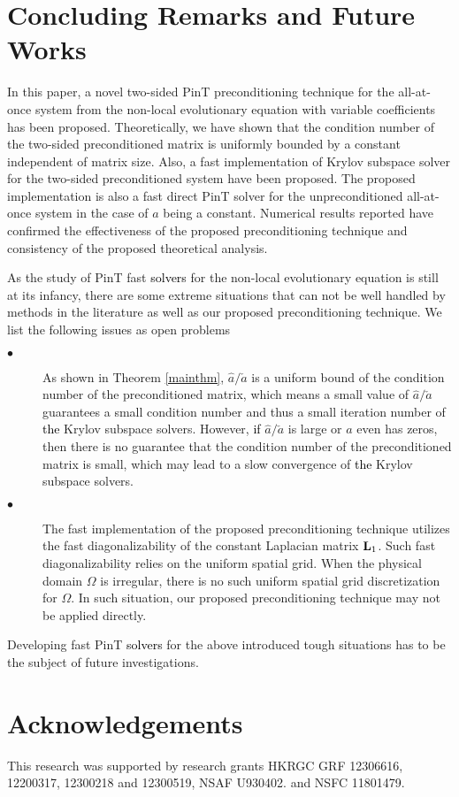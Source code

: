 \documentclass[11pt]{article}%
\numberwithin{equation}{section}
\begin{document}
\section{Concluding Remarks and Future Works}
In this paper, a novel two-sided PinT preconditioning technique for the all-at-once system from the non-local evolutionary equation with variable coefficients has been proposed. Theoretically, we have shown that the condition number of the two-sided preconditioned matrix is uniformly bounded by a constant independent of matrix size. Also, a fast implementation of Krylov subspace solver for the two-sided preconditioned system have been proposed. The proposed implementation is also a fast direct PinT solver for the unpreconditioned all-at-once system in the case of $a$ being a constant.
Numerical results reported have confirmed the effectiveness of the proposed preconditioning technique and consistency of the proposed theoretical analysis.

As the study of PinT fast \textcolor{black}{solvers} for the non-local evolutionary equation is still at its infancy, there are some extreme situations that can not be well handled by methods in the literature  as well as our proposed preconditioning technique. We list  the following issues as open problems 
\begin{description}
\item[$\bullet$] As shown in Theorem \ref{mainthm}, $\hat{a}/\check{a}$ is a uniform bound of the condition number of the preconditioned matrix, which means a small value of $\hat{a}/\check{a}$ guarantees a small condition number and thus a small iteration number of \textcolor{black}{the} Krylov subspace solvers. However, \textcolor{black}{if} $\hat{a}/\check{a}$ is large or $a$ even has zeros, then there is no guarantee that the condition number of the preconditioned matrix is small, which may lead to a slow convergence of \textcolor{black}{the} Krylov subspace solvers.
\item[$\bullet$] The fast implementation of the proposed preconditioning technique utilizes the fast diagonalizability of the constant Laplacian matrix ${\bf L}_1$. Such fast diagonalizability relies on the uniform spatial grid. When the physical domain $\Omega$ is irregular, there is no such uniform spatial grid discretization for $\Omega$. In such situation, our proposed preconditioning technique may not be applied directly.
\end{description}
Developing fast PinT \textcolor{black}{solvers} for the above introduced tough situations has to be the subject of future investigations.

\section*{Acknowledgements}
This research was supported by research grants HKRGC GRF 12306616, 12200317, 12300218 and 12300519, NSAF U930402.
and NSFC 11801479.



\end{document}
